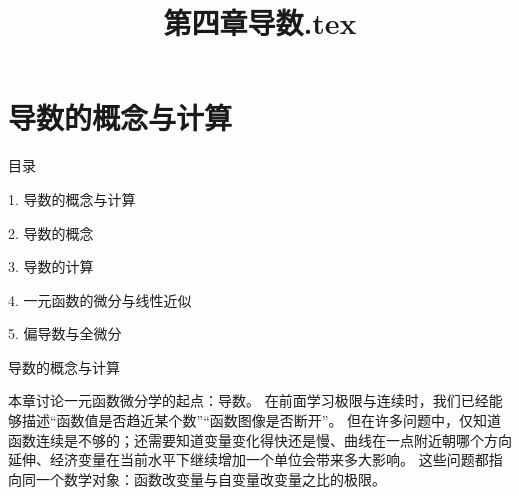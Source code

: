 \documentclass[aspectratio=169,10pt,fontset=fandol]{ctexbeamer}
\title{第四章导数.tex}
\begin{document}
\section{导数的概念与计算}
\begin{frame}[t,fragile]{目录}
\normalsize
{\color{blue}\normalsize 1. 导数的概念与计算\par}\vspace{0.22em}
{\color{gray!40}\normalsize 2. 导数的概念\par}\vspace{0.22em}
{\color{gray!40}\normalsize 3. 导数的计算\par}\vspace{0.22em}
{\color{gray!40}\normalsize 4. 一元函数的微分与线性近似\par}\vspace{0.22em}
{\color{gray!40}\normalsize 5. 偏导数与全微分\par}\vspace{0.22em}
\end{frame}
\begin{frame}[t,fragile]{导数的概念与计算}
\footnotesize
{\footnotesize
本章讨论一元函数微分学的起点：导数。 在前面学习极限与连续时，我们已经能够描述“函数值是否趋近某个数”“函数图像是否断开”。 但在许多问题中，仅知道函数连续是不够的；还需要知道变量变化得快还是慢、曲线在一点附近朝哪个方向延伸、经济变量在当前水平下继续增加一个单位会带来多大影响。 这些问题都指向同一个数学对象：函数改变量与自变量改变量之比的极限。


}
\end{frame}
\end{document}
